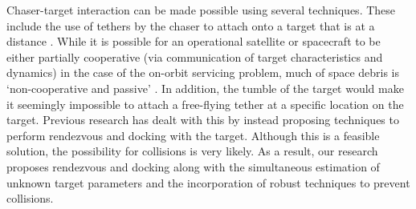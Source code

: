 Chaser-target interaction can be made possible using several techniques.
These include the use of tethers by the chaser to attach onto a target that is at a distance \cite{zhang2019trajectory,olivieri2020test}.
While it is possible for an operational satellite or spacecraft to be either partially cooperative (via communication of target characteristics and dynamics) in the case of the on-orbit servicing problem, much of space debris is `non-cooperative and passive' \cite{albee2021robust}.
In addition, the tumble of the target would make it seemingly impossible to attach a free-flying tether at a specific location on the target.
Previous research \cite{park2017nonlinear} has dealt with this by instead proposing techniques to perform rendezvous and docking with the target.
Although this is a feasible solution, the possibility for collisions is very likely.
As a result, our research proposes rendezvous and docking along with the simultaneous estimation of unknown target parameters and the incorporation of robust techniques to prevent collisions.